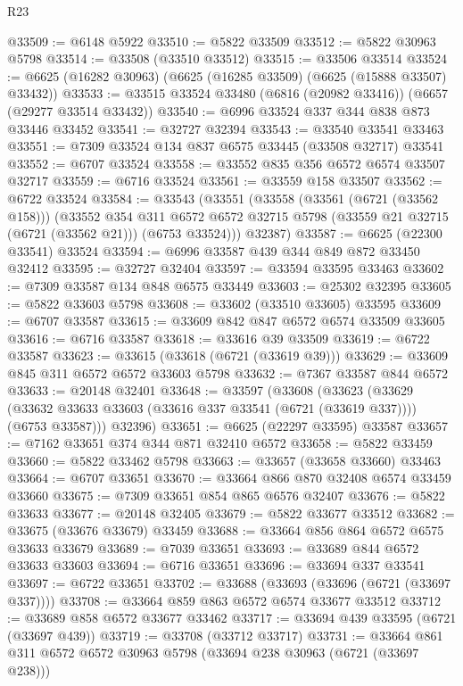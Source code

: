 \begin{lexlean}{R23}
\begin{coremodule}
@33509 := @6148 @5922
@33510 := @5822 @33509
@33512 := @5822 @30963 @5798
@33514 := @33508 (@33510 @33512)
@33515 := @33506 @33514
@33524 := @6625 (@16282 @30963) (@6625 (@16285 @33509) (@6625 (@15888 @33507) @33432))
@33533 := @33515 @33524 @33480 (@6816 (@20982 @33416)) (@6657 (@29277 @33514 @33432))
@33540 := @6996 @33524 @337 @344 @838 @873 @33446 @33452
@33541 := @32727 @32394
@33543 := @33540 @33541 @33463
@33551 := @7309 @33524 @134 @837 @6575 @33445 (@33508 @32717) @33541
@33552 := @6707 @33524
@33558 := @33552 @835 @356 @6572 @6574 @33507 @32717
@33559 := @6716 @33524
@33561 := @33559 @158 @33507
@33562 := @6722 @33524
@33584 := @33543
    (@33551
      (@33558
        (@33561 (@6721 (@33562 @158)))
        (@33552
          @354
          @311
          @6572
          @6572
          @32715
          @5798
          (@33559 @21 @32715 (@6721 (@33562 @21)))
          (@6753 @33524)))
      @32387)
@33587 := @6625 (@22300 @33541) @33524
@33594 := @6996 @33587 @439 @344 @849 @872 @33450 @32412
@33595 := @32727 @32404
@33597 := @33594 @33595 @33463
@33602 := @7309 @33587 @134 @848 @6575 @33449
@33603 := @25302 @32395
@33605 := @5822 @33603 @5798
@33608 := @33602 (@33510 @33605) @33595
@33609 := @6707 @33587
@33615 := @33609 @842 @847 @6572 @6574 @33509 @33605
@33616 := @6716 @33587
@33618 := @33616 @39 @33509
@33619 := @6722 @33587
@33623 := @33615 (@33618 (@6721 (@33619 @39)))
@33629 := @33609 @845 @311 @6572 @6572 @33603 @5798
@33632 := @7367 @33587 @844 @6572
@33633 := @20148 @32401
@33648 := @33597
    (@33608
      (@33623
        (@33629 (@33632 @33633 @33603 (@33616 @337 @33541 (@6721 (@33619 @337)))) (@6753 @33587)))
      @32396)
@33651 := @6625 (@22297 @33595) @33587
@33657 := @7162 @33651 @374 @344 @871 @32410 @6572
@33658 := @5822 @33459
@33660 := @5822 @33462 @5798
@33663 := @33657 (@33658 @33660) @33463
@33664 := @6707 @33651
@33670 := @33664 @866 @870 @32408 @6574 @33459 @33660
@33675 := @7309 @33651 @854 @865 @6576 @32407
@33676 := @5822 @33633
@33677 := @20148 @32405
@33679 := @5822 @33677 @33512
@33682 := @33675 (@33676 @33679) @33459
@33688 := @33664 @856 @864 @6572 @6575 @33633 @33679
@33689 := @7039 @33651
@33693 := @33689 @844 @6572 @33633 @33603
@33694 := @6716 @33651
@33696 := @33694 @337 @33541
@33697 := @6722 @33651
@33702 := @33688 (@33693 (@33696 (@6721 (@33697 @337))))
@33708 := @33664 @859 @863 @6572 @6574 @33677 @33512
@33712 := @33689 @858 @6572 @33677 @33462
@33717 := @33694 @439 @33595 (@6721 (@33697 @439))
@33719 := @33708 (@33712 @33717)
@33731 := @33664 @861 @311 @6572 @6572 @30963 @5798 (@33694 @238 @30963 (@6721 (@33697 @238)))

\end{coremodule}
\end{lexlean}
